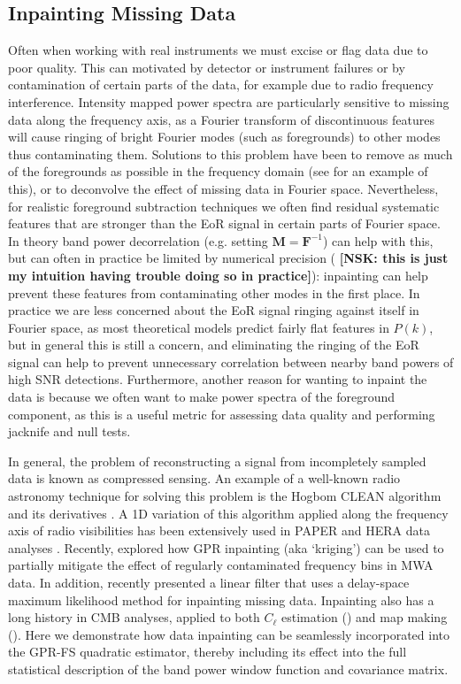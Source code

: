 \documentclass[a4paper,fleqn,usenatbib]{mnras}
\newcommand{\nsk}[1]{{\color{blue} \textbf{[NSK:  #1]}}}
\def\F{\boldsymbol{F}}
\def\M{\boldsymbol{M}}
\begin{document}
\subsection{Inpainting Missing Data}
\label{sec:inpainting}
Often when working with real instruments we must excise or flag data due to poor quality.
This can motivated by detector or instrument failures or by contamination of certain parts of the data, for example due to radio frequency interference.
Intensity mapped power spectra are particularly sensitive to missing data along the frequency axis, as a Fourier transform of discontinuous features will cause ringing of bright Fourier modes (such as foregrounds) to other modes thus contaminating them.
Solutions to this problem have been to remove as much of the foregrounds as possible in the frequency domain (see \citet{Ewall-Wice2020} for an example of this), or to deconvolve the effect of missing data in Fourier space.
Nevertheless, for realistic foreground subtraction techniques we often find residual systematic features that are stronger than the EoR signal in certain parts of Fourier space.
In theory band power decorrelation (e.g. setting $\M=\F^{-1}$) can help with this, but can often in practice be limited by numerical precision (\nsk{this is just my intuition having trouble doing so in practice}): inpainting can help prevent these features from contaminating other modes in the first place.
In practice we are less concerned about the EoR signal ringing against itself in Fourier space, as most theoretical models predict fairly flat features in $P(k)$, but in general this is still a concern, and eliminating the ringing of the EoR signal can help to prevent unnecessary correlation between nearby band powers of high SNR detections.
Furthermore, another reason for wanting to inpaint the data is because we often want to make power spectra of the foreground component, as this is a useful metric for assessing data quality and performing jacknife and null tests.

In general, the problem of reconstructing a signal from incompletely sampled data is known as compressed sensing.
An example of a well-known radio astronomy technique for solving this problem is the Hogbom CLEAN algorithm and its derivatives \citep{Hogbom1974}.
A 1D variation of this algorithm applied along the frequency axis of radio visibilities has been extensively used in PAPER and HERA data analyses \citep{Parsons2009, Ali2015, Kerrigan2018, Kern2020a}.
Recently, \citet{Trott2020} explored how GPR inpainting (aka `kriging') can be used to partially mitigate the effect of regularly contaminated frequency bins in MWA data.
In addition, \citet{Ewall-Wice2020} recently presented a linear filter that uses a delay-space maximum likelihood method for inpainting missing data.
Inpainting also has a long history in CMB analyses, applied to both $C_\ell$ estimation () and map making ().
Here we demonstrate how data inpainting can be seamlessly incorporated into the GPR-FS quadratic estimator, thereby including its effect into the full statistical description of the band power window function and covariance matrix.
\end{document}
